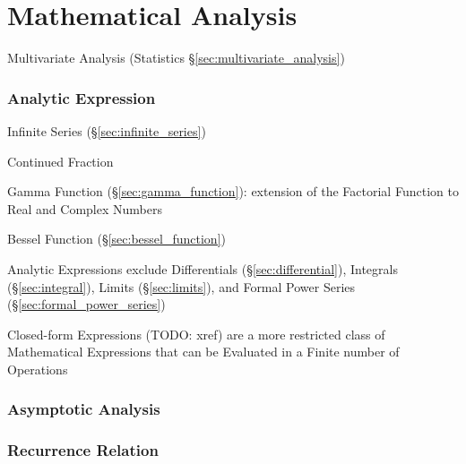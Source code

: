 \part{Mathematical Analysis}\label{part:mathematical_analysis}

\fist Multivariate Analysis (Statistics
\S\ref{sec:multivariate_analysis})



\section{Analytic Expression}\label{sec:analytic_expression}

Infinite Series (\S\ref{sec:infinite_series})

Continued Fraction

Gamma Function (\S\ref{sec:gamma_function}): extension of the Factorial
Function to Real and Complex Numbers

Bessel Function (\S\ref{sec:bessel_function})

Analytic Expressions exclude Differentials (\S\ref{sec:differential}),
Integrals (\S\ref{sec:integral}), Limits (\S\ref{sec:limits}), and Formal Power
Series (\S\ref{sec:formal_power_series})

Closed-form Expressions (TODO: xref) are a more restricted class of Mathematical
Expressions that can be Evaluated in a Finite number of Operations



\section{Asymptotic Analysis}\label{sec:asymptotic_analysis}




\section{Recurrence Relation}\label{sec:recurrence_relation}

